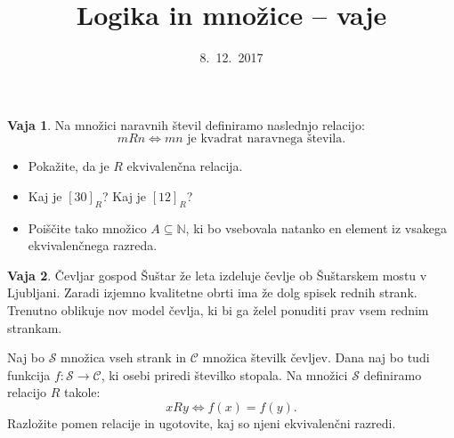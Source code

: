 \documentclass{article}
\newcommand{\NN}{\mathbb{N}}
\theoremstyle{definition}
\newtheorem{vaja}{Vaja}
\begin{document}
\title{Logika in množice -- vaje}
\date{8.~12.~2017}
\maketitle


\begin{vaja}
	Na množici naravnih števil definiramo naslednjo relacijo:
	\[m R n \iff \text{$m n$ je kvadrat naravnega števila}.\]
	\begin{itemize}
		\item
		Pokažite, da je $R$ ekvivalenčna relacija.
		\item
		Kaj je $[30]_R$? Kaj je $[12]_R$?
		\item
		Poiščite tako množico $A \subseteq \NN$, ki bo vsebovala natanko en element iz vsakega ekvivalenčnega razreda.
	\end{itemize}
\end{vaja}

\begin{vaja}
	Čevljar gospod Šuštar že leta izdeluje čevlje ob Šuštarskem mostu v Ljubljani. Zaradi izjemno kvalitetne obrti ima že dolg spisek rednih strank. Trenutno oblikuje nov model čevlja, ki bi ga želel ponuditi prav vsem rednim strankam.
	
  Naj bo $\mathcal{S}$ množica vseh strank in $\mathcal{C}$ množica številk čevljev. Dana naj bo tudi funkcija $f\colon \mathcal{S} \to \mathcal{C}$, ki osebi priredi številko stopala. Na množici $\mathcal{S}$ definiramo relacijo $R$ takole:
  \begin{equation*}
    x R y \iff f(x) = f(y).
  \end{equation*}
  Razložite pomen relacije in ugotovite, kaj so njeni ekvivalenčni razredi.
\end{vaja}

\end{document}
